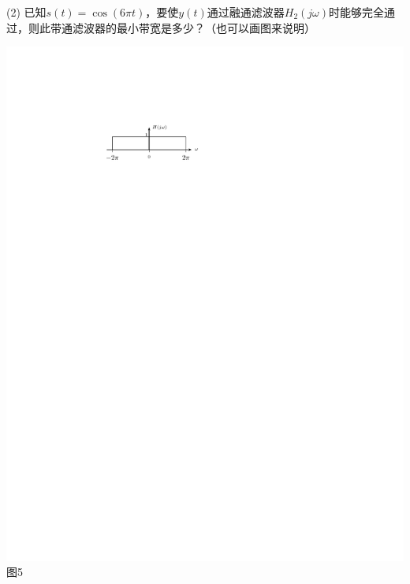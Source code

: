 \documentclass[11pt,twoside]{ctexart}
\begin{document}
\begin{enumerate}[leftmargin=0em]
(2) 已知$s(t)=\cos(6\pi t)$，要使$y(t)$通过融通滤波器$H_2(j\omega)$时能够完全通过，则此带通滤波器的最小带宽是多少？（也可以画图来说明）\par
\begin{center}
	\includegraphics{img/14-2-3.pdf}\\
{图5}
\end{center}
\vfill\newpage
%
%

\end{enumerate}
\end{document}
